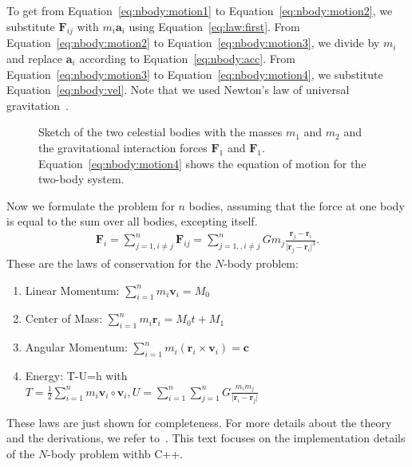 To get from Equation~\eqref{eq:nbody:motion1} to Equation~\eqref{eq:nbody:motion2}, we substitute $\mathbf{F}_{ij}$ with $m_i \mathbf{a}_i$ using Equation~\ref{eq:law:first}.  From Equation~\eqref{eq:nbody:motion2} to Equation~\eqref{eq:nbody:motion3}, we divide by $m_i$ and replace $\mathbf{a}_i$ according to Equation~\ref{eq:nbody:acc}. From Equation~\eqref{eq:nbody:motion3} to Equation~\eqref{eq:nbody:motion4}, we substitute Equation~\ref{eq:nbody:vel}. Note that we used Newton's law of universal gravitation~\cite{newton1833philosophiae}.\\


\begin{figure}[tb]
\centering
{}
\caption{Sketch of the two celestial bodies with the masses $m_1$ and $m_2$ and the gravitational interaction forces $\mathbf{F}_1$ and $\mathbf{F}_1$. Equation~\ref{eq:nbody:motion4} shows the equation of motion for the two-body system.   }
\label{fig:nbody:motion}
\end{figure}

Now we formulate the problem for $n$ bodies, assuming that the force at one body is equal to the sum over all bodies, excepting itself.
\begin{align}
\mathbf{F}_i = \sum\limits_{j=1,i\neq j}^n \mathbf{F}_{ij} = \sum\limits_{j=1,,i\neq j}^n G  m_j \frac{\mathbf{r}_j - \mathbf{r}_i}{\vert \mathbf{r}_j - \mathbf{r}_i\vert^3} \text{.} \label{eq:nbody:motion}
\end{align}
These are the laws of conservation for the $N$-body problem:
\begin{enumerate}
\item Linear Momentum: $\sum\limits_{i=1}^n m_i \mathbf{v}_i = M_0$
\item Center of Mass: $\sum\limits_{i=1}^n m_i \mathbf{r}_i = M_0 t + M_1$
\item Angular Momentum: $\sum\limits_{i=1}^n m_i (\mathbf{r}_i \times \mathbf{v}_i) = \mathbf{c}$
\item Energy: T-U=h with \\
$ T = \frac{1}{2} \sum\limits_{i=1}^n m_i \mathbf{v}_i \circ \mathbf{v}_i  , U= \sum\limits_{i=1}^n \sum\limits_{j=1}^n G \frac{m_i m_j}{\vert\mathbf{r}_i - \mathbf{r}_j\vert} $
\end{enumerate}
These laws are just shown for completeness. For more details about the theory and the derivations, we refer to~\cite{aarseth2008cambridge,aarseth2003gravitational}. This text focuses on the implementation details of the $N$-body problem withb C++.


